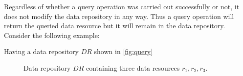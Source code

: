 Regardless of whether a query operation was carried out successfully or not, it does not modify the data repository in any way. Thus a query operation will return the queried data resource but it will remain in the data repository. Consider the following example:

\begin{example}
Having a data repository $DR$ shown in \autoref{fig:query}
\begin{figure}[!ht]
    \begin{center}
        
        \caption{Data repository $DR$ containing three data resources $r_1, r_2, r_3$.}
        \label{fig:query}
    \end{center}
\end{figure}
\end{example}